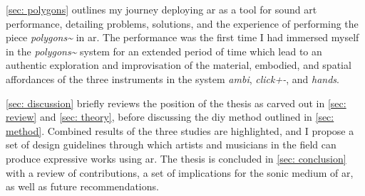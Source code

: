 \autoref{sec: polygons} outlines my journey deploying \gls{ar} as a tool for sound \gls{art} performance, detailing problems, solutions, and the experience of performing the piece \textit{polygons\textasciitilde{}} in \gls{ar}. The performance was the first time I had immersed myself in the \textit{polygons\textasciitilde{}} system for an extended period of time which lead to an authentic exploration and improvisation of the material, embodied, and spatial affordances of the three instruments in the system \textit{ambi}, \textit{click+-}, and \textit{hands}.

\autoref{sec: discussion} briefly reviews the position of the thesis as carved out in \autoref{sec: review} and \autoref{sec: theory}, before discussing the \gls{diy} method outlined in \autoref{sec: method}. Combined results of the three studies are highlighted, and I propose a set of design guidelines through which artists and musicians in the field can produce expressive works using \gls{ar}. The thesis is concluded in \autoref{sec: conclusion} with a review of contributions, a set of implications for the sonic medium of \gls{ar}, as well as future recommendations.

